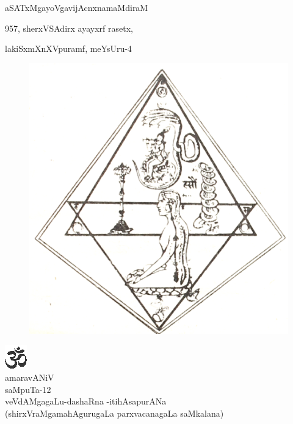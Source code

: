 \vskip -10pt

\begin{center}

{\large aSATxMgayoVgavijAcnxnamaMdiraM}

{\normalsize 957, sherxVSAdirx ayayxrf rasetx,}

{\normalsize lakiSxmXnXVpuramf, meYsUru-4}

\end{center}

\newpage

\begin{figure}[h]
\centerline
{\includegraphics[scale=.18]{0000b.eps}}
\end{figure}

\begin{center}
{\includegraphics[scale=1.5]{om.eps}}\\[5pt]

{\large amaravANiV}\\[5pt]

{\normalsize saMpuTa-12}\\[5pt]

{\large veVdAMgagaLu-dashaRna -itihAsapurANa}\\[5pt]

{\normalsize (shirxVraMgamahAgurugaLa parxvacanagaLa saMkalana)}
\end{center}

